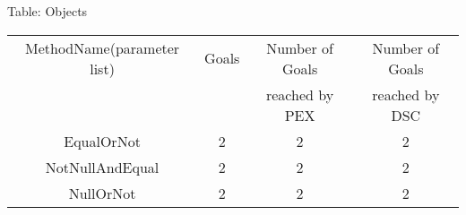 \begin{table}
{Table: Objects}
\begin{center}
\begin{tabular}{c|c|c|c}
\hline



MethodName(parameter list)                             &       Goals       &  Number of Goals  &  Number of Goals       \\
                                                       &                   &  reached by PEX   &  reached by DSC        \\\hline\hline



EqualOrNot                                             &           2       &           2       &           2             \\
NotNullAndEqual                                        &           2       &           2       &           2             \\
NullOrNot                                              &           2       &           2       &           2             \\



\hline
\end{tabular}
\end{center}
\label{table-failed}
\end{table}
